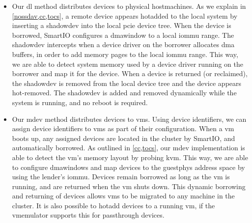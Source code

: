 \begin{itemize}
    \item
        Our \gls{dl} method distributes devices to physical \glspl{hostmachine}.
        As we explain in \cref{nossdav,cc,tocs}, a remote device appears \gls{hotadded} to the local system by inserting a \gls{shadowdev} into the local \gls{pcie} device tree.
        When the device is borrowed, SmartIO configures a \gls{dmawindow} to a local \gls{iommu} range.
        The \gls{shadowdev} intercepts when a device driver on the \gls{borrower} allocates \gls{dma} buffers, in order to add memory pages to the local \gls{iommu} range.
        This way, we are able to detect system memory used by a device driver running on the \gls{borrower} and map it for the device.
        When a device is returned (or reclaimed), the \gls{shadowdev} is removed from the local device tree and the device appears hot-removed.
        The \gls{shadowdev} is added and removed dynamically while the system is running, and no reboot is required.


    \item Our \gls{mdev} method distributes devices to \glspl{vm}.
        Using device identifiers, we can assign device identifiers to \glspl{vm} as part of their configuration.
        When a \gls{vm} boots up, any assigned devices are located in the cluster by SmartIO, and automatically borrowed. 
        As outlined in \cref{cc,tocs}, our \gls{mdev} implementation is able to detect the \gls{vm}'s memory layout by probing \gls{kvm}.
        This way, we are able to configure \glspl{dmawindow} and map devices to the \gls{guestphys} address space by using the \gls{lender}'s \gls{iommu}.
        Devices remain borrowed as long as the \gls{vm} is running, and are returned when the \gls{vm} shuts down.
        This dynamic borrowing and returning of devices allows \glspl{vm} to be migrated to any machine in the cluster.
        It is also possible to \gls{hotadd} devices to a running \gls{vm}, if the \gls{vmemulator} supports this for \gls{passthrough} devices.
        


\end{itemize}
